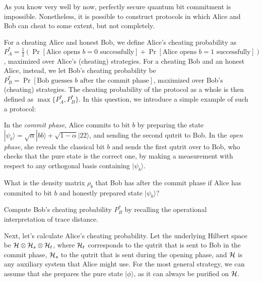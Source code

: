 \documentclass[a4paper,10pt,landscape,twocolumn]{scrartcl}
\newcommand{\ket}[1]{| #1 \rangle}
\begin{document}
\begin{exercise}
As you know very well by now, perfectly secure quantum bit commitment is impossible. Nonetheless, it is possible to construct protocols in which Alice and Bob can cheat to some extent, but not completely. 

For a cheating Alice and honest Bob, we define Alice's cheating probability as $P_A^* = \frac12(\Pr[\text{Alice opens $b=0$ successfully}]+ \Pr[\text{Alice opens $b=1$ successfully}])$, maximized over Alice's (cheating) strategies. For a cheating Bob and an honest Alice, instead, we let Bob's cheating probability be
$P_B^*= \Pr[\text{Bob guesses $b$ after the commit phase}]$, maximized over Bob's (cheating) strategies. The cheating probability of the protocol as a whole is then defined as $\max\{P_A^*,P_B^*\}$. In this question, we introduce a simple example of such a protocol:

In the \emph{commit phase}, Alice commits to bit $b$ by preparing the state 
$\ket{\psi_b}= \sqrt{\alpha} \ket{bb} + \sqrt{1-\alpha} \ket{22}$, and sending the second qutrit to Bob. In the \emph{open phase}, she reveals the classical bit $b$ and sends the first qutrit over to Bob, who checks that the pure state is the correct one, by making a measurement with respect to any orthogonal basis containing $\ket{\psi_b}$.

\begin{subex}
What is the density matrix $\rho_b$ that Bob has after the commit phase if Alice has commited to bit $b$ and honestly prepared state $\ket{\psi_b}$?
\end{subex}

\begin{subex} \label{subex:bob}
Compute Bob's cheating probability $P_B^*$ by recalling the operational interpretation of trace distance.
\end{subex}

\begin{subex}
Next, let's calculate Alice's cheating probability. Let the underlying Hilbert space be $\mathcal{H} \otimes \mathcal{H}_s \otimes \mathcal{H}_t$, where $\mathcal{H}_t$ corresponds to the qutrit that is sent to Bob in the commit phase, $\mathcal{H}_s$ to the qutrit that is sent during the opening phase, and $\mathcal{H}$ is any auxiliary system that Alice might use. For the most general strategy, we can assume that she prepares the pure state $\ket{\phi}$, as it can always be purified on $\mathcal{H}$.


\end{subex}
\end{exercise}
\end{document}
